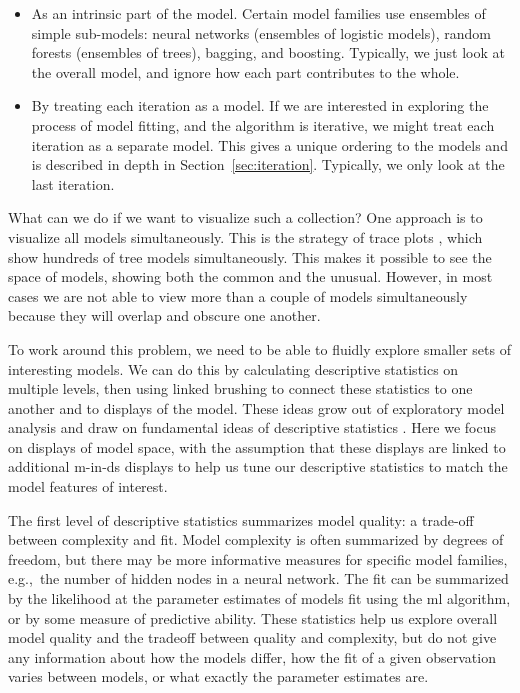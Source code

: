 \documentclass[preprint]{imsart}
\begin{document}
\begin{itemize}
  \item As an intrinsic part of the model.  Certain model families use ensembles of simple sub-models: neural networks (ensembles of logistic models), random forests (ensembles of trees), bagging, and boosting. Typically, we just look at the overall model, and ignore how each part contributes to the whole.

  \item By treating each iteration as a model.  If we are interested in exploring the process of model fitting, and the algorithm is iterative, we might treat each iteration as a separate model.  This gives a unique ordering to the models and is described in depth in Section~\ref{sec:iteration}.  Typically, we only look at the last iteration.

\end{itemize}

What can we do if we want to visualize such a collection? One approach is to visualize all models simultaneously. This is the strategy of trace plots \citep{urbanek:2005}, which show hundreds of tree models simultaneously. This makes it possible to see the space of models, showing both the common and the unusual. However, in most cases we are not able to view more than a couple of models simultaneously because they will overlap and obscure one another.

To work around this problem, we need to be able to fluidly explore smaller sets of interesting models. We can do this by calculating descriptive statistics on multiple levels, then using linked brushing to connect these statistics to one another and to displays of the model. These ideas grow out of exploratory model analysis \citep{unwin:2003aa,urbanek:2004} and draw on fundamental ideas of descriptive statistics \citep{bickel:1975a,bickel:1975b}. Here we focus on displays of model space, with the assumption that these displays are linked to additional m-in-ds displays to help us tune our descriptive statistics to match the model features of interest.

The first level of descriptive statistics summarizes model quality: a trade-off between complexity and fit. Model complexity is often summarized by degrees of freedom, but there may be more informative measures for specific model families, e.g.,\ the number of hidden nodes in a neural network. The fit can be summarized by the likelihood at the parameter estimates of models fit using the {\sc ml} algorithm, or by some measure of predictive ability. These statistics help us explore overall model quality and the tradeoff between quality and complexity, but do not give any information about how the models differ, how the fit of a given observation varies between models, or what exactly the parameter estimates are.
\end{document}

